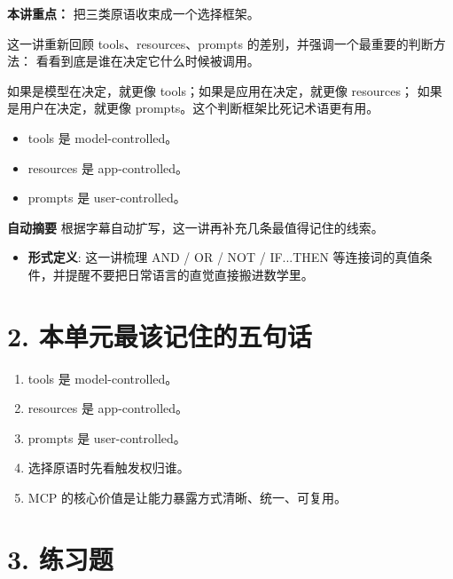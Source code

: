 \documentclass[UTF8,a4paper,11pt]{ctexart}
\begin{document}
\textbf{本讲重点：} 把三类原语收束成一个选择框架。

这一讲重新回顾 tools、resources、prompts 的差别，并强调一个最重要的判断方法：
看看到底是谁在决定它什么时候被调用。

如果是模型在决定，就更像 tools；如果是应用在决定，就更像 resources；
如果是用户在决定，就更像 prompts。这个判断框架比死记术语更有用。

\begin{itemize}
  \item tools 是 model-controlled。
  \item resources 是 app-controlled。
  \item prompts 是 user-controlled。
\end{itemize}

\begin{keyconcept}
\textbf{自动摘要}
根据字幕自动扩写，这一讲再补充几条最值得记住的线索。
\begin{itemize}
  \item \textbf{形式定义}: 这一讲梳理 AND / OR / NOT / IF...THEN 等连接词的真值条件，并提醒不要把日常语言的直觉直接搬进数学里。
\end{itemize}
\end{keyconcept}

\section*{2. 本单元最该记住的五句话}
\begin{enumerate}
  \item tools 是 model-controlled。
  \item resources 是 app-controlled。
  \item prompts 是 user-controlled。
  \item 选择原语时先看触发权归谁。
  \item MCP 的核心价值是让能力暴露方式清晰、统一、可复用。
\end{enumerate}

\section*{3. 练习题}
\end{document}
